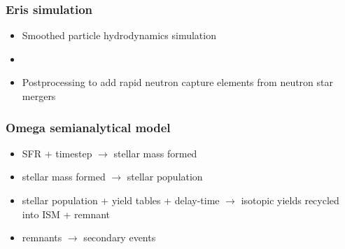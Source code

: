 \begin{frame}
  \frametitle{Eris simulation}
  \begin{minipage}{0.45\linewidth}
  \end{minipage}
  \hfill
  \begin{minipage}{0.45\linewidth}
    \begin{itemize}
    \item Smoothed particle hydrodynamics simulation 
    \item {}
    \item Postprocessing to add rapid neutron capture elements from neutron star mergers 
    \end{itemize}
  \end{minipage}
\end{frame}

\begin{frame}
  \frametitle{Omega semianalytical model }
  \begin{itemize}
  \item SFR + timestep $\rightarrow$ stellar mass formed
  \item stellar mass formed $\rightarrow$ stellar population
  \item stellar population + yield tables + delay-time $\rightarrow$ isotopic yields recycled into ISM + remnant
  \item remnants $\rightarrow$ secondary events
  \end{itemize}
\end{frame}

\begin{frame}
  \centering
  \textbf{
    \Large
    \mytitle
  }
\end{frame}
